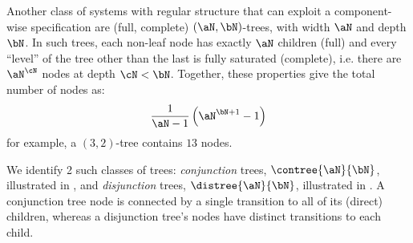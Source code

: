 Another class of systems with regular structure that can exploit a
component-wise specification are (full, complete)
$(\aN,\bN)$-trees, with width $\aN$ and depth $\bN$. In such trees, each
non-leaf node has exactly $\aN$ children (full) and every ``level'' of the tree
other than the last is fully saturated (complete), i.e. there are $\aN^\cN$
nodes at depth $\cN < \bN$. Together, these properties give the total number of
nodes as:
\[
    \frac{1}{\aN-1} \left(\aN^{\bN+1} - 1\right)
\]
for example, a $(3,2)$-tree contains $13$ nodes.

We identify 2 such classes of trees: \emph{conjunction} trees,
$\contree{\aN}{\bN}$, illustrated in , and
\emph{disjunction} trees, $\distree{\aN}{\bN}$, illustrated in
. A conjunction tree node is connected by a single
transition to all of its (direct) children, whereas a disjunction tree's nodes
have distinct transitions to each child.

\newcommand{\drawConTreeLevel}[2][0]{
    \def\levelSepA{0.75cm}
    \node[pnbplace] (p#2-0) {};

    \node (p#2-1) [pnbplace, right=of p#2-0, yshift=-1.5*\levelSepA, anchor=center] {};
    \node (p#2-2) [pnbplace, right=of p#2-0, yshift=-0.5*\levelSepA, anchor=center] {};
    \node         [right=of p#2-0, yshift=0.5*\levelSepA, anchor=center, rotate=90] {$\cdots$};
    \node (p#2-3) [pnbplace, right=of p#2-0, yshift=1.5*\levelSepA, anchor=center] {};

    \tikzstyle{foo}=[pnbarr, o0i180]

    \ifthenelse{\equal{#1}{0}}{
        \coordinate (join#2) at ([xshift=0.5cm]p#2-0);
        \draw (p#2-0.out) edge[pnbarr, mark inside=1] (join#2);
    }{
        \tikzset{foo/.append style={mark inside=0.75}}
        \coordinate (join#2) at (p#2-0.out);
    }

    \draw (join#2) edge[foo] (p#2-1.in);
    \draw (join#2) edge[foo] (p#2-2.in);
    \draw (join#2) edge[foo] (p#2-3.in);

    \draw[mirrorbrace, decoration={raise=0.125cm}] (p#2-1.out) -- (p#2-3.out) node [right=0.2cm, pos=0.5] {$\aN$};
}

